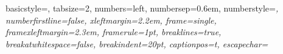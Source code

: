 
{
	basicstyle=\ttfamily\footnotesize,
	tabsize=2,
	numbers=left,
	numbersep=0.6em,			%
	numberstyle=\footnotesize\ttfamily\itshape,
	numberfirstline=false,
	xleftmargin=2.2em,		%
	frame=single,			%
	framexleftmargin=2.3em,	%
	framerule=1pt,
	breaklines=true,
	breakatwhitespace=false,
	breakindent=20pt,
	captionpos=t,
	escapechar=~
}

{
	\fancyhf{}	%
	\fancyhead[LE,RO] {\thepage}
	\renewcommand {\headrulewidth}{0pt}
	\renewcommand {\footrulewidth}{0pt}
}